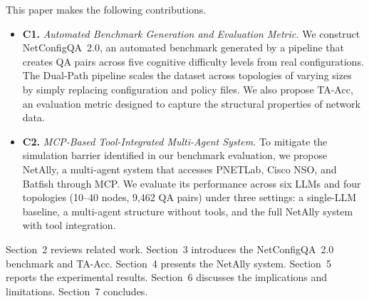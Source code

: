 This paper makes the following contributions.
\begin{itemize}
  \item \textbf{C1.} \emph{Automated Benchmark Generation and Evaluation Metric.}
    We construct NetConfigQA~2.0, an automated benchmark generated by a pipeline that creates QA pairs across five cognitive difficulty levels from real configurations.
    The Dual-Path pipeline scales the dataset across topologies of varying sizes by simply replacing configuration and policy files.
    We also propose TA-Acc, an evaluation metric designed to capture the structural properties of network data.

  \item \textbf{C2.} \emph{MCP-Based Tool-Integrated Multi-Agent System.}
    To mitigate the simulation barrier identified in our benchmark evaluation, we propose NetAlly, a multi-agent system that accesses PNETLab, Cisco NSO, and Batfish through MCP.
    We evaluate its performance across six LLMs and four topologies (10--40 nodes, 9,462 QA pairs) under three settings: a single-LLM baseline, a multi-agent structure without tools, and the full NetAlly system with tool integration.
\end{itemize}




Section~2 reviews related work.
Section~3 introduces the NetConfigQA~2.0 benchmark and TA-Acc.
Section~4 presents the NetAlly system.
Section~5 reports the experimental results.
Section~6 discusses the implications and limitations.
Section~7 concludes.


